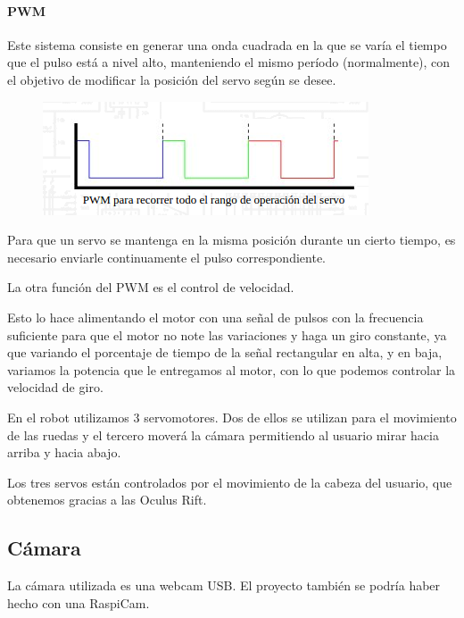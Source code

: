 \documentclass[twoside, 11pt]{epstfg}
\begin{document}
\paragraph{PWM}

Este sistema consiste en generar una onda cuadrada en la que se varía el tiempo que el pulso está a nivel alto, manteniendo el mismo período (normalmente), con el objetivo de modificar la posición del servo según se desee.

\begin{figure}[h]
	\centerline{
		\mbox{\includegraphics[width=.80\textwidth]{images/ondaServo.png}}
	}
	
\end{figure}



Para que un servo se mantenga en la misma posición durante un cierto tiempo, es necesario enviarle continuamente el pulso correspondiente.


La otra función del PWM es el control de velocidad.

Esto lo hace alimentando el motor con una señal de pulsos con la frecuencia suficiente para que el motor no note las variaciones y haga un giro constante, ya que variando el porcentaje de tiempo de la señal rectangular en alta, y en baja, variamos la potencia que le entregamos al motor, con lo que podemos controlar la velocidad de giro.

En el robot utilizamos 3 servomotores.
Dos de ellos se utilizan para el movimiento de las ruedas y el tercero moverá la cámara permitiendo al usuario mirar hacia arriba y hacia abajo.

Los tres servos están controlados por el movimiento de la cabeza del usuario, que obtenemos gracias a las Oculus Rift.

\subsection{Cámara}

La cámara utilizada es una webcam USB. El proyecto también se podría haber hecho con una RaspiCam.
\end{document}
